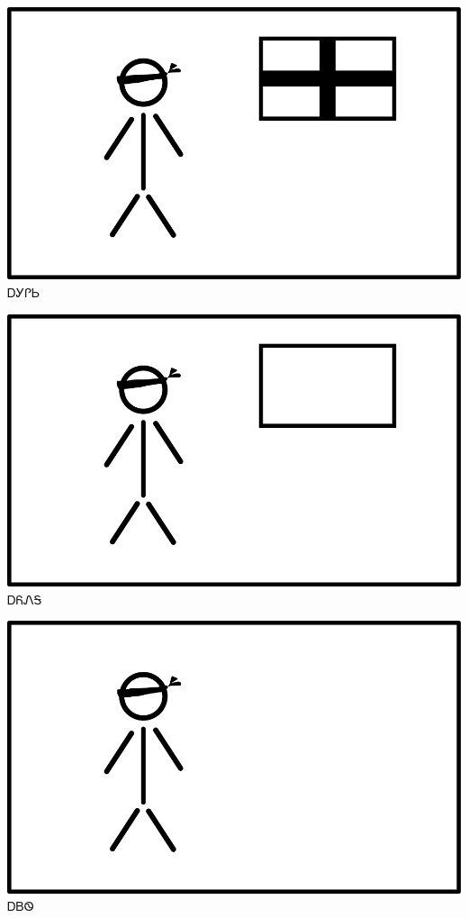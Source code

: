 \documentclass[avery5371]{flashcards}%
\begin{document}
    \begin{flashcard}{
        \includegraphics[width=0.95\columnwidth,height=.51\columnwidth,keepaspectratio]{../artwork/flags/agilisi-flag-blind}
    }
        \Huge ᎠᎩᎵᏏ
    \end{flashcard}

    \begin{flashcard}{
        \includegraphics[width=0.95\columnwidth,height=.51\columnwidth,keepaspectratio]{../artwork/flags/ayonega-flag-blind}
    }
        \Huge ᎠᏲᏁᎦ
    \end{flashcard}

    \begin{flashcard}{
        \includegraphics[width=0.95\columnwidth,height=.51\columnwidth,keepaspectratio]{../artwork/flags/ayvwi-no-flag-blind}
    }
        \Huge ᎠᏴᏫ
    \end{flashcard}
\end{document}

